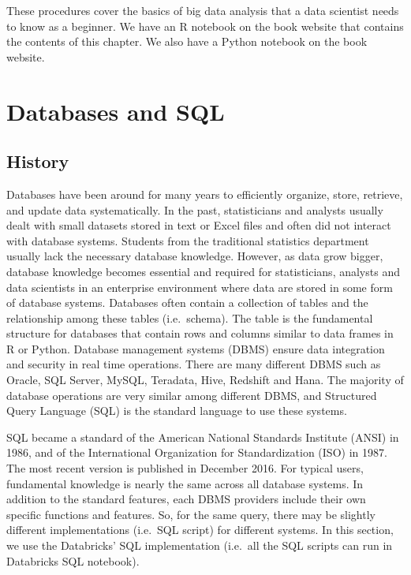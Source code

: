 \documentclass[
  12pt,
]{krantz}
\begin{document}
These procedures cover the basics of big data analysis that a data scientist needs to know as a beginner. We have an R notebook on the book website that contains the contents of this chapter. We also have a Python notebook on the book website.

\hypertarget{databases-and-sql}{%
\section{Databases and SQL}\label{databases-and-sql}}

\hypertarget{history}{%
\subsection{History}\label{history}}

Databases have been around for many years to efficiently organize, store, retrieve, and update data systematically. In the past, statisticians and analysts usually dealt with small datasets stored in text or Excel files and often did not interact with database systems. Students from the traditional statistics department usually lack the necessary database knowledge. However, as data grow bigger, database knowledge becomes essential and required for statisticians, analysts and data scientists in an enterprise environment where data are stored in some form of database systems. Databases often contain a collection of tables and the relationship among these tables (i.e.~schema). The table is the fundamental structure for databases that contain rows and columns similar to data frames in R or Python. Database management systems (DBMS) ensure data integration and security in real time operations. There are many different DBMS such as Oracle, SQL Server, MySQL, Teradata, Hive, Redshift and Hana. The majority of database operations are very similar among different DBMS, and Structured Query Language (SQL) is the standard language to use these systems.

SQL became a standard of the American National Standards Institute (ANSI) in 1986, and of the International Organization for Standardization (ISO) in 1987. The most recent version is published in December 2016. For typical users, fundamental knowledge is nearly the same across all database systems. In addition to the standard features, each DBMS providers include their own specific functions and features. So, for the same query, there may be slightly different implementations (i.e.~SQL script) for different systems. In this section, we use the Databricks' SQL implementation (i.e.~all the SQL scripts can run in Databricks SQL notebook).
\end{document}
